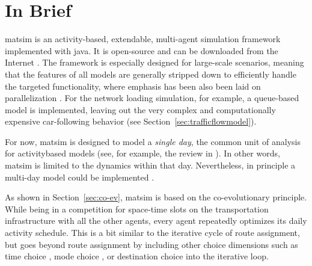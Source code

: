 \section{In Brief}
\label{sec:inbrief}
\gls{matsim} is an activity-based, extendable, multi-agent simulation \gls{framework} 
implemented with 
\gls{java}. It is open-source and can be downloaded from the Internet \citep[][]{MATSIM_Webpage_2015, SourceForge_Webpage_2015}. The \gls{framework} is especially designed for large-scale scenarios, meaning that the features of all models are generally stripped down to efficiently handle the targeted functionality, where emphasis has been also been laid on parallelization \citep[e.g.,][]{Dobler_TechRep_IVT_2011, Charypar_PhDThesis_2008}. For the network loading simulation, for example, a queue-based model is implemented, leaving out the very complex and computationally expensive car-following behavior (see Section~\ref{sec:trafficflowmodel}).

For now, \gls{matsim} is 
%
designed to model a \emph{single day}, the common unit of analysis for \gls{activitybased} models (see, for example, the review in \citet[][]{Bowman_TEC_2009_1}). In other words, \gls{matsim} is limited to the dynamics within that day. Nevertheless, in principle a multi-day model could be implemented \citep[][]{ZilskeEtc2012AddingFreightToMatsim,HorniEtAl_TechRep_IVT_2012_a}.

As shown in Section~\ref{sec:co-ev}, \gls{matsim} is based on the co-evolutionary principle. While being in a competition for space-time slots on the transportation infrastructure with all the other agents, every agent repeatedly optimizes its daily \gls{activity} schedule.  This is a bit similar to the iterative cycle of route assignment, but goes beyond route assignment by including other choice dimensions such as time choice \citep{BalmerRaneyEtAl2005act-times}, mode choice \citep{GretherEtAl2009SimpleModeChoiceIPL}, or destination choice \citep{HorniEtAl2011TrbLocationChoice} into the iterative loop.

